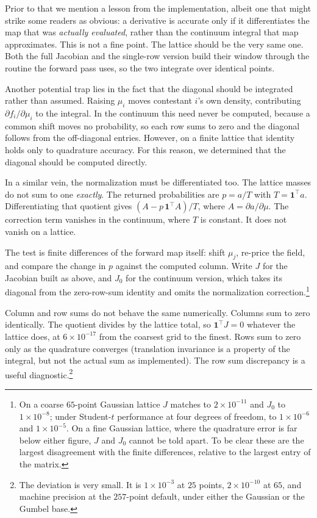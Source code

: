 \documentclass[11pt]{article}
\begin{document}
Prior to that we mention a lesson from the implementation, albeit one
that might strike some readers as obvious: a derivative is accurate only
if it differentiates the map that was \emph{actually evaluated}, rather
than the continuum integral that map approximates. This is not a fine point. The lattice should be the very same one. Both the full Jacobian and the single-row version build their window through the routine the forward
pass uses, so the two integrate over identical points.

Another potential trap lies in the fact that the diagonal should be integrated rather than assumed. Raising $\mu_i$
moves contestant $i$'s own density, contributing $\partial
f_i/\partial\mu_i$ to the integral. In the continuum this need never be
computed, because a common shift moves no probability, so each row sums to zero
and the diagonal follows from the off-diagonal entries. However, on a finite
lattice that identity holds only to quadrature accuracy. For this
reason, we determined that the diagonal should be computed directly.

In a similar vein, the normalization must be differentiated too. The lattice masses do
not sum to one \emph{exactly}. The returned probabilities are $p=a/T$ with
$T=\mathbf{1}^{\top}a$. Differentiating that quotient gives
$(A-p\,\mathbf{1}^{\top}A)/T$, where $A=\partial a/\partial\mu$. The
correction term vanishes in the continuum, where $T$ is constant. It does not vanish on a lattice.

The test is finite differences of the forward map itself: shift $\mu_j$,
re-price the field, and compare the change in $p$ against the computed
column. Write $J$ for the Jacobian built as above, and $J_0$ for the
continuum version, which takes its diagonal from the zero-row-sum
identity and omits the normalization correction.\footnote{On a coarse $65$-point Gaussian lattice $J$ matches
to $2\times10^{-11}$ and $J_0$ to $1\times10^{-8}$; under Student-$t$
performance at four degrees of freedom, to $1\times10^{-6}$ and
$1\times10^{-5}$. On a fine Gaussian lattice, where the quadrature error
is far below either figure, $J$ and $J_0$ cannot be told apart. To be clear these are the largest disagreement with the finite differences, relative to the largest
entry of the matrix.}

Column and row sums do not behave the same numerically. Columns sum to zero identically. The quotient
divides by the lattice total, so $\mathbf{1}^{\top}J=0$ whatever the
lattice does, at $6\times10^{-17}$ from the coarsest grid to the finest.
Rows sum to zero only as the quadrature converges (translation
invariance is a property of the integral, but not the actual sum as implemented). The row sum discrepancy is a useful diagnostic.\footnote{The deviation is very small. It is
$1\times10^{-3}$ at $25$ points,
$2\times10^{-10}$ at $65$, and machine precision at the $257$-point
default, under either the Gaussian or the Gumbel base.}
\end{document}
